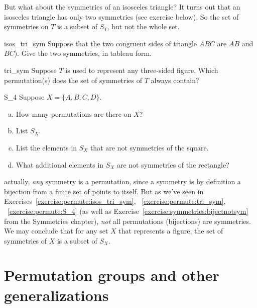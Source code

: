 But what about the symmetries of an isosceles triangle? It turns out that an isosceles triangle has only two symmetries (see exercise below). 
So  the set of symmetries on $T$ is a subset of $S_T$, but not the whole set.

\begin{exercise}{isos_tri_sym}
Suppose that the two congruent sides of triangle $ABC$ are $\overline{AB}$ and $\overline{BC}$). Give the two symmetries, in tableau form.
\end{exercise}

\begin{exercise}{tri_sym}
Suppose $T$ is used to represent any three-sided figure.  
Which permutation(s) does the set of symmetries of $T$ always contain?
\end{exercise}

\begin{exercise}{S_4}
Suppose $X = \{A, B, C, D\}$.
\begin{enumerate}[(a)]
\item
How many permutations are there on $X$?
\item
List $S_X$.
\item
List the elements in $S_X$ that are not symmetries of the square.
\item
What additional elements in $S_X$ are not symmetries of the rectangle?
\end{enumerate}
\end{exercise}

actually, \emph{any} symmetry is a permutation, since a symmetry is by definition a bijection from a finite set of points to itself.  But as we've seen in Exercises~\ref{exercise:permute:isos_tri_sym}, ~\ref{exercise:permute:tri_sym}, ~\ref{exercise:permute:S_4} (as well as Exercise~\ref{exercise:symmetries:bijectnotsym} from the Symmetries chapter), \emph{not} all permutations (bijections) are symmetries.  We may conclude that for any set $X$ that represents a figure, the set of symmetries of  $X$ is a subset of $S_X$.


\section{Permutation groups and other generalizations}

